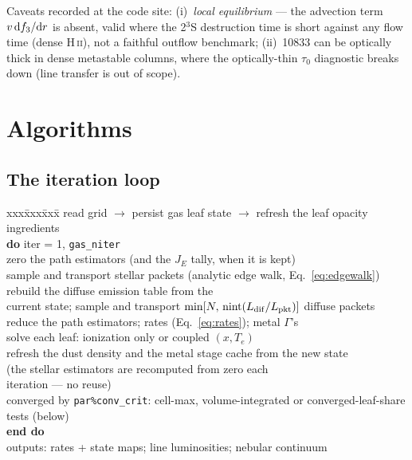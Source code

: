 \documentclass[english,a4paper]{my_memo}
\newcommand{\code}[1]{\texttt{#1}}
\begin{document}
Caveats recorded at the code site: (i)~\emph{local equilibrium} --- the
advection term $v\,{\rm d}f_3/{\rm d}r$ is absent, valid where the 2$^3$S
destruction time is short against any flow time (dense H\,\textsc{ii}), not
a faithful outflow benchmark; (ii)~10833 can be optically thick in dense
metastable columns, where the optically-thin $\tau_0$ diagnostic breaks down
(line transfer is out of scope).

\section{Algorithms}
\subsection{The iteration loop}
\begin{center}
\begin{minipage}{0.86\textwidth}
\begin{tabbing}
xxx\=xxx\=xxx\=\kill
read grid $\rightarrow$ persist gas leaf state $\rightarrow$ refresh the leaf
  opacity ingredients\\
\textbf{do} iter = 1, \code{gas\_niter}\\
\> zero the path estimators (and the $J_E$ tally, when it is kept)\\
\> sample and transport stellar packets (analytic edge walk, Eq.~\ref{eq:edgewalk})\\
 rebuild the diffuse emission table from the\\
\> \> current state; sample and transport
   $\min[N,\,\mathrm{nint}(L_{\rm dif}/L_{\rm pkt})]$ diffuse packets\\
\> reduce the path estimators; rates (Eq.~\ref{eq:rates}); metal $\Gamma$'s\\
\> solve each leaf: ionization only or coupled $(x, T_e)$\\
\> refresh the dust density and the metal stage cache from the new state\\
\> \> (the stellar estimators are recomputed from zero each\\
\> \> iteration --- no reuse)\\
\> converged by \code{par\%conv\_crit}: cell-max, volume-integrated or
   converged-leaf-share tests (below)\\
\textbf{end do}\\
outputs: rates + state maps; line luminosities; nebular continuum
\end{tabbing}
\end{minipage}
\end{center}
\end{document}
